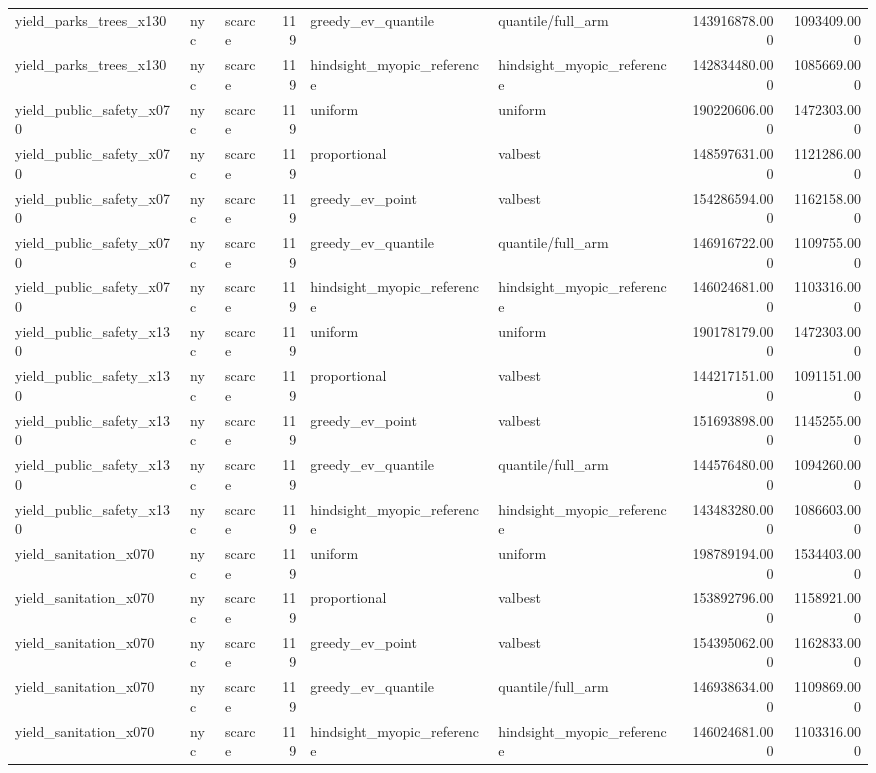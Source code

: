 \begin{tabular}{lllrllrr}
yield\_parks\_trees\_x130 & nyc & scarce & 119 & greedy\_ev\_quantile & quantile/full\_arm & 143916878.000 & 1093409.000 \\
yield\_parks\_trees\_x130 & nyc & scarce & 119 & hindsight\_myopic\_reference & hindsight\_myopic\_reference & 142834480.000 & 1085669.000 \\
yield\_public\_safety\_x070 & nyc & scarce & 119 & uniform & uniform & 190220606.000 & 1472303.000 \\
yield\_public\_safety\_x070 & nyc & scarce & 119 & proportional & valbest & 148597631.000 & 1121286.000 \\
yield\_public\_safety\_x070 & nyc & scarce & 119 & greedy\_ev\_point & valbest & 154286594.000 & 1162158.000 \\
yield\_public\_safety\_x070 & nyc & scarce & 119 & greedy\_ev\_quantile & quantile/full\_arm & 146916722.000 & 1109755.000 \\
yield\_public\_safety\_x070 & nyc & scarce & 119 & hindsight\_myopic\_reference & hindsight\_myopic\_reference & 146024681.000 & 1103316.000 \\
yield\_public\_safety\_x130 & nyc & scarce & 119 & uniform & uniform & 190178179.000 & 1472303.000 \\
yield\_public\_safety\_x130 & nyc & scarce & 119 & proportional & valbest & 144217151.000 & 1091151.000 \\
yield\_public\_safety\_x130 & nyc & scarce & 119 & greedy\_ev\_point & valbest & 151693898.000 & 1145255.000 \\
yield\_public\_safety\_x130 & nyc & scarce & 119 & greedy\_ev\_quantile & quantile/full\_arm & 144576480.000 & 1094260.000 \\
yield\_public\_safety\_x130 & nyc & scarce & 119 & hindsight\_myopic\_reference & hindsight\_myopic\_reference & 143483280.000 & 1086603.000 \\
yield\_sanitation\_x070 & nyc & scarce & 119 & uniform & uniform & 198789194.000 & 1534403.000 \\
yield\_sanitation\_x070 & nyc & scarce & 119 & proportional & valbest & 153892796.000 & 1158921.000 \\
yield\_sanitation\_x070 & nyc & scarce & 119 & greedy\_ev\_point & valbest & 154395062.000 & 1162833.000 \\
yield\_sanitation\_x070 & nyc & scarce & 119 & greedy\_ev\_quantile & quantile/full\_arm & 146938634.000 & 1109869.000 \\
yield\_sanitation\_x070 & nyc & scarce & 119 & hindsight\_myopic\_reference & hindsight\_myopic\_reference & 146024681.000 & 1103316.000 \\

\end{tabular}
